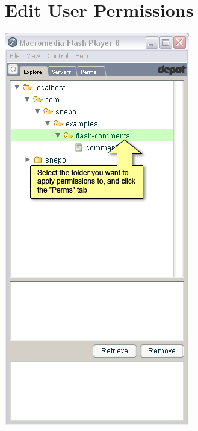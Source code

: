 \documentclass{report}
\begin{document}
\section{Edit User Permissions}
\begin{center}
\includegraphics[scale=0.5]{users-images/Step8-annotated.png}

\end{center}
\end{document}
